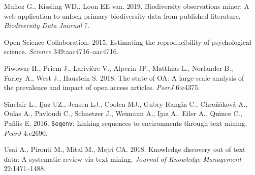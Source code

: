 \documentclass[author-year, review, 11pt]{components/elsarticle} %
\begin{document}
\leavevmode\hypertarget{ref-Munoz2019}{}%
Muñoz G., Kissling WD., Loon EE van. 2019. Biodiversity observations
miner: A web application to unlock primary biodiversity data from
published literature. \emph{Biodiversity Data Journal} 7.

\leavevmode\hypertarget{ref-OSC2015}{}%
Open Science Collaboration. 2015. Estimating the reproducibility of
psychological science. \emph{Science} 349:aac4716--aac4716.

\leavevmode\hypertarget{ref-Piwowar2018}{}%
Piwowar H., Priem J., Larivière V., Alperin JP., Matthias L., Norlander
B., Farley A., West J., Haustein S. 2018. The state of OA: A large-scale
analysis of the prevalence and impact of open access articles.
\emph{PeerJ} 6:e4375.

\leavevmode\hypertarget{ref-Sinclair2016}{}%
Sinclair L., Ijaz UZ., Jensen LJ., Coolen MJ., Gubry-Rangin C.,
Chroňáková A., Oulas A., Pavloudi C., Schnetzer J., Weimann A., Ijaz A.,
Eiler A., Quince C., Pafilis E. 2016. \texttt{Seqenv}: Linking sequences
to environments through text mining. \emph{PeerJ} 4:e2690.

\leavevmode\hypertarget{ref-Usai2018}{}%
Usai A., Pironti M., Mital M., Mejri CA. 2018. Knowledge discovery out
of text data: A systematic review via text mining. \emph{Journal of
Knowledge Management} 22:1471--1488.
\end{document}
